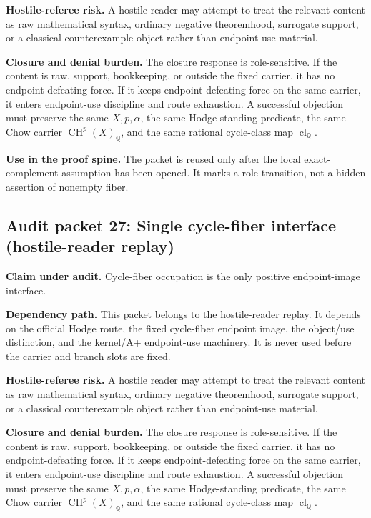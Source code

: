 \documentclass[11pt]{article}
\newcommand{\QQ}{\mathbb{Q}}
\newcommand{\CH}{\operatorname{CH}}
\newcommand{\clQ}{\operatorname{cl}_{\QQ}}
\begin{document}
\par\noindent\textbf{Hostile-referee risk.} A hostile reader may attempt to treat the relevant content as raw mathematical syntax, ordinary negative theoremhood, surrogate support, or a classical counterexample object rather than endpoint-use material.


\par\noindent\textbf{Closure and denial burden.} The closure response is role-sensitive. If the content is raw, support, bookkeeping, or outside the fixed carrier, it has no endpoint-defeating force. If it keeps endpoint-defeating force on the same carrier, it enters endpoint-use discipline and route exhaustion. A successful objection must preserve the same $X,p,\alpha$, the same Hodge-standing predicate, the same Chow carrier $\CH^p(X)_\QQ$, and the same rational cycle-class map $\clQ$.


\par\noindent\textbf{Use in the proof spine.} The packet is reused only after the local exact-complement assumption has been opened. It marks a role transition, not a hidden assertion of nonempty fiber.


\subsection{Audit packet 27: Single cycle-fiber interface (hostile-reader replay)}


\par\noindent\textbf{Claim under audit.} Cycle-fiber occupation is the only positive endpoint-image interface.


\par\noindent\textbf{Dependency path.} This packet belongs to the hostile-reader replay. It depends on the official Hodge route, the fixed cycle-fiber endpoint image, the object/use distinction, and the kernel/A+ endpoint-use machinery. It is never used before the carrier and branch slots are fixed.


\par\noindent\textbf{Hostile-referee risk.} A hostile reader may attempt to treat the relevant content as raw mathematical syntax, ordinary negative theoremhood, surrogate support, or a classical counterexample object rather than endpoint-use material.


\par\noindent\textbf{Closure and denial burden.} The closure response is role-sensitive. If the content is raw, support, bookkeeping, or outside the fixed carrier, it has no endpoint-defeating force. If it keeps endpoint-defeating force on the same carrier, it enters endpoint-use discipline and route exhaustion. A successful objection must preserve the same $X,p,\alpha$, the same Hodge-standing predicate, the same Chow carrier $\CH^p(X)_\QQ$, and the same rational cycle-class map $\clQ$.
\end{document}
